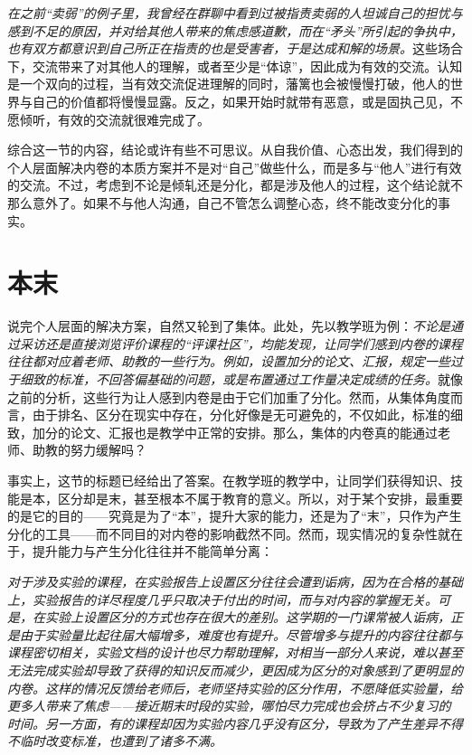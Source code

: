 \documentclass[UTF8,a4paper,fontset=windows,11pt,openany]{ctexbook}
\begin{document}
\emph{在之前“卖弱”的例子里，我曾经在群聊中看到过被指责卖弱的人坦诚自己的担忧与感到不足的原因，并对给其他人带来的焦虑感道歉，而在“矛头”所引起的争执中，也有双方都意识到自己所正在指责的也是受害者，于是达成和解的场景。}这些场合下，交流带来了对其他人的理解，或者至少是“体谅”，因此成为有效的交流。认知是一个双向的过程，当有效交流促进理解的同时，藩篱也会被慢慢打破，他人的世界与自己的价值都将慢慢显露。反之，如果开始时就带有恶意，或是固执己见，不愿倾听，有效的交流就很难完成了。

综合这一节的内容，结论或许有些不可思议。从自我价值、心态出发，我们得到的个人层面解决内卷的本质方案并不是对“自己”做些什么，而是多与“他人”进行有效的交流。不过，考虑到不论是倾轧还是分化，都是涉及他人的过程，这个结论就不那么意外了。如果不与他人沟通，自己不管怎么调整心态，终不能改变分化的事实。

\section{本末}

说完个人层面的解决方案，自然又轮到了集体。此处，先以教学班为例：\emph{不论是通过采访还是直接浏览评价课程的“评课社区”，均能发现，让同学们感到内卷的课程往往都对应着老师、助教的一些行为。例如，设置加分的论文、汇报，规定一些过于细致的标准，不回答偏基础的问题，或是布置通过工作量决定成绩的任务。}就像之前的分析，这些行为让人感到内卷是由于它们加重了分化。然而，从集体角度而言，由于排名、区分在现实中存在，分化好像是无可避免的，不仅如此，标准的细致，加分的论文、汇报也是教学中正常的安排。那么，集体的内卷真的能通过老师、助教的努力缓解吗？

事实上，这节的标题已经给出了答案。在教学班的教学中，让同学们获得知识、技能是本，区分却是末，甚至根本不属于教育的意义。所以，对于某个安排，最重要的是它的目的——究竟是为了“本”，提升大家的能力，还是为了“末”，只作为产生分化的工具——而不同目的对内卷的影响截然不同。然而，现实情况的复杂性就在于，提升能力与产生分化往往并不能简单分离：

\emph{对于涉及实验的课程，在实验报告上设置区分往往会遭到诟病，因为在合格的基础上，实验报告的详尽程度几乎只取决于付出的时间，而与对内容的掌握无关。可是，在实验上设置区分的方式也存在很大的差别。这学期的一门课常被人诟病，正是由于实验量比起往届大幅增多，难度也有提升。尽管增多与提升的内容往往都与课程密切相关，实验文档的设计也尽力帮助理解，对相当一部分人来说，难以甚至无法完成实验却导致了获得的知识反而减少，更因成为区分的对象感到了更明显的内卷。这样的情况反馈给老师后，老师坚持实验的区分作用，不愿降低实验量，给更多人带来了焦虑——接近期末时段的实验，哪怕尽力完成也会挤占不少复习的时间。另一方面，有的课程却因为实验内容几乎没有区分，导致为了产生差异不得不临时改变标准，也遭到了诸多不满。}
\end{document}
